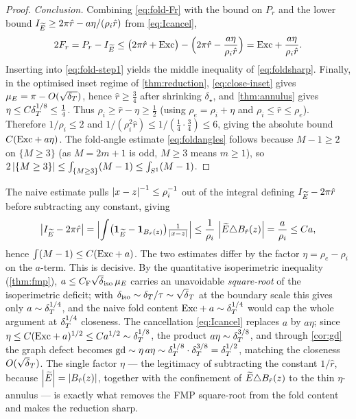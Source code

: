 \begin{proof}
\emph{Conclusion.}
Combining \eqref{eq:fold-Fr} with the bound on $P_r$ and the lower bound
$I_{\widetilde{E}}\ge2\pi\hat r-a\eta/(\rho_i\hat r)$ from \eqref{eq:Icancel},
\[
   2F_r=P_r-I_{\widetilde{E}}
   \le\bigl(2\pi\hat r+\mathrm{Exc}\bigr)
      -\Bigl(2\pi\hat r-\frac{a\eta}{\rho_i\hat r}\Bigr)
   =\mathrm{Exc}+\frac{a\eta}{\rho_i\hat r}.
\]
Inserting into \eqref{eq:fold-step1} yields the middle inequality of
\eqref{eq:foldsharp}. Finally, in the optimised inset regime of
\cref{thm:reduction}, \eqref{eq:close-inset} gives
$\mu_E=\pi-O(\sqrt{\delta_T})$, hence $\hat r\ge\tfrac34$ after shrinking
$\delta_\star$, and \cref{thm:annulus} gives
$\eta\le C\delta_T^{1/8}\le\tfrac14$. Thus $\rho_i\ge\hat r-\eta\ge\tfrac12$
(using
$\rho_e=\rho_i+\eta$ and $\rho_i\le\hat r\le\rho_e$). Therefore
$1/\rho_i\le2$ and $1/(\rho_i^2\hat r)\le1/(\tfrac14\cdot\tfrac34)\le6$,
giving the absolute bound $C(\mathrm{Exc}+a\eta)$. The fold-angle estimate \eqref{eq:foldangles} follows
because $M-1\ge2$ on $\{M\ge3\}$ (as $M=2m+1$ is odd, $M\ge3$ means
$m\ge1$), so $2\left\lvert\{M\ge3\}\right\rvert\le\int_{\{M\ge3\}}(M-1)\le\int_{S^1}(M-1)$.
\end{proof}

\begin{remark}\label{rem:eta-matters}
The naive estimate pulls $\left\lvert x-z\right\rvert^{-1}\le\rho_i^{-1}$ out of the integral
defining $I_{\widetilde{E}}-2\pi\hat r$ before subtracting any constant, giving
\[
   \bigl|I_{\widetilde{E}}-2\pi\hat r\bigr|
   =\Bigl|\int\bigl(\mathbf1_{\widetilde{E}}-\mathbf1_{B_{\hat r}(z)}\bigr)
        \tfrac1{\left\lvert x-z\right\rvert}\Bigr|
   \le\frac1{\rho_i}\,\left\lvert\widetilde{E}\triangle B_{\hat r}(z)\right\rvert
   =\frac{a}{\rho_i}\le Ca,
\]
hence $\int(M-1)\le C(\mathrm{Exc}+a)$. The two estimates differ by the factor
$\eta=\rho_e-\rho_i$ on the $a$-term. This is decisive. By the quantitative
isoperimetric inequality (\cref{thm:fmp}), $a\le C_{\mathrm F}\sqrt\diso\,
\mu_E$ carries an unavoidable \emph{square-root} of the isoperimetric
deficit; with $\diso\sim\dT/\tau\sim\sqrt\dT$ at the boundary scale this
gives only $a\sim\delta_T^{1/4}$, and the naive fold content
$\mathrm{Exc}+a\sim\delta_T^{1/4}$ would cap the whole argument at $\delta_T^{1/4}$ closeness.
The cancellation \eqref{eq:Icancel} replaces $a$ by $a\eta$; since
$\eta\le C(\mathrm{Exc}+a)^{1/2}\le Ca^{1/2}\sim\delta_T^{1/8}$, the product
$a\eta\sim\delta_T^{3/8}$, and through \cref{cor:gd} the graph defect becomes
$\mathrm{gd}\sim\eta\,a\eta\sim\delta_T^{1/8}\cdot\delta_T^{3/8}=\delta_T^{1/2}$, matching the
closeness $O(\sqrt\dT)$. The single factor $\eta$ --- the legitimacy of
subtracting the constant $1/\hat r$, because $\left\lvert\widetilde{E}\right\rvert=\left\lvert B_{\hat r}(z)\right\rvert$,
together with the confinement of $\widetilde{E}\triangle B_{\hat r}(z)$ to the thin
$\eta$-annulus --- is exactly what removes the FMP square-root from the fold
content and makes the reduction sharp.
\end{remark}

